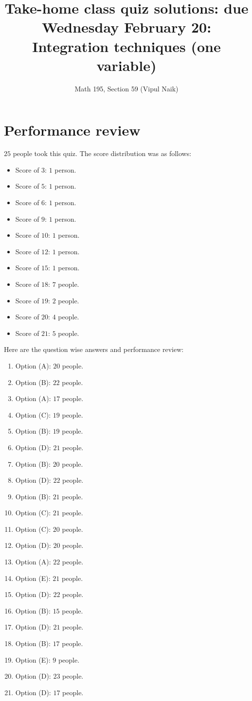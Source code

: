 \documentclass[10pt]{amsart}
\title{Take-home class quiz solutions: due Wednesday February 20: Integration techniques (one variable)}
\author{Math 195, Section 59 (Vipul Naik)}
\begin{document}
\maketitle

\section{Performance review}

$25$ people took this quiz. The score distribution was as follows:

\begin{itemize}
\item Score of $3$: $1$ person.
\item Score of $5$: $1$ person.
\item Score of $6$: $1$ person.
\item Score of $9$: $1$ person.
\item Score of $10$: $1$ person.
\item Score of $12$: $1$ person.
\item Score of $15$: $1$ person.
\item Score of $18$: $7$ people.
\item Score of $19$: $2$ people.
\item Score of $20$: $4$ people.
\item Score of $21$: $5$ people.
\end{itemize}
Here are the question wise answers and performance review:

\begin{enumerate}
\item Option (A): $20$ people.
\item Option (B): $22$ people.
\item Option (A): $17$ people.
\item Option (C): $19$ people.
\item Option (B): $19$ people.
\item Option (D): $21$ people.
\item Option (B): $20$ people.
\item Option (D): $22$ people.
\item Option (B): $21$ people.
\item Option (C): $21$ people.
\item Option (C): $20$ people.
\item Option (D): $20$ people.
\item Option (A): $22$ people.
\item Option (E): $21$ people.
\item Option (D): $22$ people.
\item Option (B): $15$ people.
\item Option (D): $21$ people.
\item Option (B): $17$ people.
\item Option (E): $9$ people.
\item Option (D): $23$ people.
\item Option (D): $17$ people.
\end{enumerate}
\end{document}
